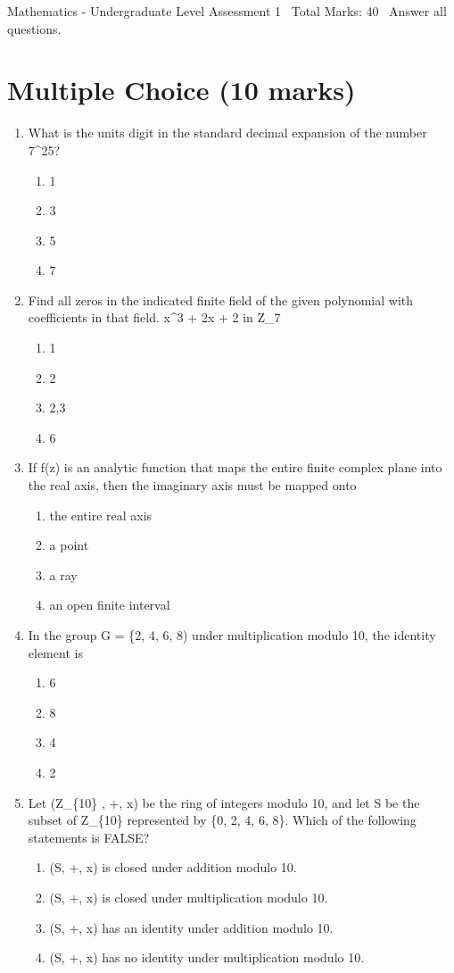 \documentclass[12pt]{article}
\begin{document}
\begin{center}
Mathematics - Undergraduate Level Assessment 1 \
Total Marks: 40 \
Answer all questions.
\end{center}

\section*{Multiple Choice (10 marks)}
\begin{enumerate}[label=\arabic*.]
\item What is the units digit in the standard decimal expansion of the number 7\^{}25?
\begin{enumerate}[label=(\alph*)]
    \item 1
    \item 3
    \item 5
    \item 7
\end{enumerate}
\item Find all zeros in the indicated finite field of the given polynomial with coefficients in
that field. x\^{}3 + 2x + 2 in Z\_7
\begin{enumerate}[label=(\alph*)]
    \item 1
    \item 2
    \item 2,3
    \item 6
\end{enumerate}
\item If f(z) is an analytic function that maps the entire finite complex plane into the real
axis, then the imaginary axis must be mapped onto
\begin{enumerate}[label=(\alph*)]
    \item the entire real axis
    \item a point
    \item a ray
    \item an open finite interval
\end{enumerate}
\item In the group G = \{2, 4, 6, 8) under multiplication modulo 10, the identity element is
\begin{enumerate}[label=(\alph*)]
    \item 6
    \item 8
    \item 4
    \item 2
\end{enumerate}
\item Let (Z\_\{10\} , +, x) be the ring of integers modulo 10, and let S be the subset of Z\_\{10\}
represented by \{0, 2, 4, 6, 8\}. Which of the following statements is FALSE?
\begin{enumerate}[label=(\alph*)]
    \item (S, +, x) is closed under addition modulo 10.
    \item (S, +, x) is closed under multiplication modulo 10.
    \item (S, +, x) has an identity under addition modulo 10.
    \item (S, +, x) has no identity under multiplication modulo 10.
\end{enumerate}
\end{enumerate}
\end{document}
